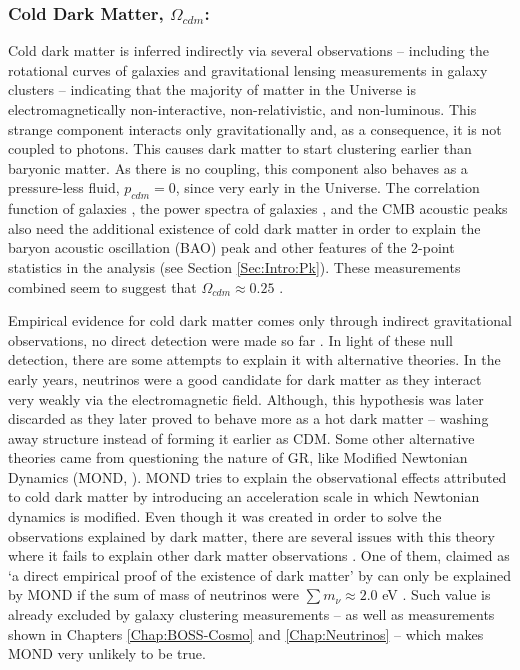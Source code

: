 \subsubsection{Cold Dark Matter, $\Omega_{cdm}$:}
Cold dark matter is inferred indirectly via several observations -- including the rotational curves of galaxies \citep{1970Rubin,1973RobersRots} and gravitational lensing measurements in galaxy clusters \citep{2006BulletCluster} -- indicating that the majority of matter in the Universe is electromagnetically non-interactive, non-relativistic, and non-luminous. This strange component interacts only gravitationally and, as a consequence, it is not coupled to photons. This causes dark matter to start clustering earlier than baryonic matter. As there is no coupling, this component also behaves as a pressure-less fluid, $p_{cdm} = 0$, since very early in the Universe. The correlation function of galaxies \citep{Einsenstein2005}, the power spectra of galaxies \citep{Blake2007,BOSS}, and the CMB acoustic peaks \citep{PlanckCosmology2016,PlanckResults2015,2018PlanckCosmology} also need the additional existence of cold dark matter in order to explain the baryon acoustic oscillation (BAO) peak and other features of the 2-point statistics in the analysis (see Section \ref{Sec:Intro:Pk}). These measurements combined seem to suggest that $\Omega_{cdm} \approx 0.25$ .

\qquad Empirical evidence for cold dark matter comes only through indirect gravitational observations, no direct detection were made so far \citep{2017DarkMatterExpReview}. In light of these null detection, there are some attempts to explain it with alternative theories. In the early years, neutrinos were a good candidate for dark matter as they interact very weakly via the electromagnetic field. Although, this hypothesis was later discarded as they later proved to behave more as a hot dark matter -- washing away structure instead of forming it earlier as CDM. Some other alternative theories came from questioning the nature of GR, like Modified Newtonian Dynamics (MOND, \citealt{1983MOND}). MOND tries to explain the observational effects attributed to cold dark matter by introducing an acceleration scale in which Newtonian dynamics is modified. Even though it was created in order to solve the observations explained by dark matter, there are several issues with this theory where it fails to explain other dark matter observations \citep{2011MondSucks}. One of them, claimed as `a direct empirical proof of the existence of dark matter' by \cite{2006BulletCluster} can only be explained by MOND if the sum of mass of neutrinos were $\sum m_{\nu} \approx 2.0$ eV \citep{2007ApJ...654L..13A}. Such value is already excluded by galaxy clustering measurements -- \citealt{Thomas2010Neutr,2014Gonzalez-GarciaNeutrino} as well as measurements shown in Chapters \ref{Chap:BOSS-Cosmo} and \ref{Chap:Neutrinos} -- which makes MOND very unlikely to be true.  

